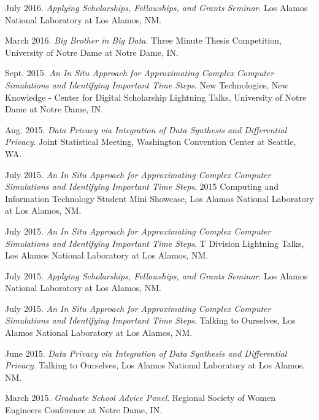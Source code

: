 \documentclass[11pt, letterpaper, roman]{moderncv} %
\begin{document}
\begin{etaremune}[topsep=0pt, itemsep=6pt, partopsep=0pt, parsep=0pt]
  \item July 2016. \textit{Applying Scholarships, Fellowships, and Grants Seminar}. Los Alamos National Laboratory at Los Alamos, NM.
  
  \item March 2016. \textit{Big Brother in Big Data}. Three Minute Thesis Competition, University of Notre Dame at Notre Dame, IN.

  \item Sept. 2015. \textit{An In Situ Approach for Approximating Complex Computer Simulations and Identifying Important Time Steps}. New Technologies, New Knowledge - Center for Digital Scholarship Lightning Talks, University of Notre Dame at Notre Dame, IN.

  \item Aug. 2015. \textit{Data Privacy via Integration of Data Synthesis and Differential Privacy}. Joint Statistical Meeting, Washington Convention Center at Seattle, WA.

  \item July 2015. \textit{An In Situ Approach for Approximating Complex Computer Simulations and Identifying Important Time Steps}. 2015 Computing and Information Technology Student Mini Showcase, Los Alamos National Laboratory at Los Alamos, NM.

  \item July 2015. \textit{An In Situ Approach for Approximating Complex Computer Simulations and Identifying Important Time Steps}. T Division Lightning Talks, Los Alamos National Laboratory at Los Alamos, NM.
  
  \item July 2015. \textit{Applying Scholarships, Fellowships, and Grants Seminar}. Los Alamos National Laboratory at Los Alamos, NM.
  
  \item July 2015. \textit{An In Situ Approach for Approximating Complex Computer Simulations and Identifying Important Time Steps}. Talking to Ourselves, Los Alamos National Laboratory at Los Alamos, NM.

  \item June 2015. \textit{Data Privacy via Integration of Data Synthesis and Differential Privacy}. Talking to Ourselves, Los Alamos National Laboratory at Los Alamos, NM. 
  
  \item March 2015. \textit{Graduate School Advice Panel}.  Regional Society of Women Engineers Conference at Notre Dame, IN.
  

\end{etaremune}
\end{document}
